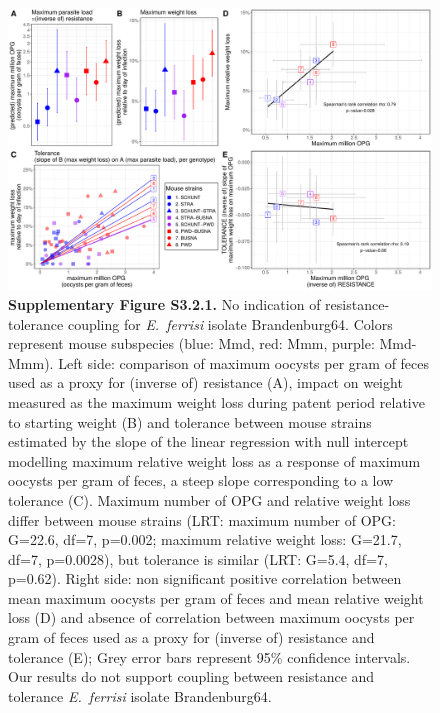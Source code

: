 \begin{figure}[H]
	\centering
	\includegraphics[width=\linewidth,height=\textheight,keepaspectratio]{images/3article2/SupplFig4.pdf}
	\captionsetup{labelformat=empty}
	\caption{\textbf{Supplementary Figure S3.2.1.} No indication of resistance-tolerance coupling for \textit{E.~ferrisi} isolate Brandenburg64. Colors represent mouse subspecies (blue: Mmd, red: Mmm, purple: Mmd-Mmm). Left side: comparison of maximum oocysts per gram of feces used as a proxy for (inverse of) resistance (A), impact on weight measured as the maximum weight loss during patent period relative to starting weight (B) and tolerance between mouse strains estimated by the slope of the linear regression with null intercept modelling maximum relative weight loss as a response of maximum oocysts per gram of feces, a steep slope corresponding to a low tolerance (C). Maximum number of OPG and relative weight loss differ between mouse strains (LRT: maximum number of OPG: G=22.6, df=7, p=0.002; maximum relative weight loss: G=21.7, df=7, p=0.0028), but tolerance is similar (LRT: G=5.4, df=7, p=0.62). Right side: non significant positive correlation between mean maximum oocysts per gram of feces and mean relative weight loss (D) and absence of correlation between maximum oocysts per gram of feces used as a proxy for (inverse of) resistance and tolerance (E); Grey error bars represent 95\% confidence intervals. Our results do not support coupling between resistance and tolerance \textit{E.~ferrisi} isolate Brandenburg64.}
\end{figure}

